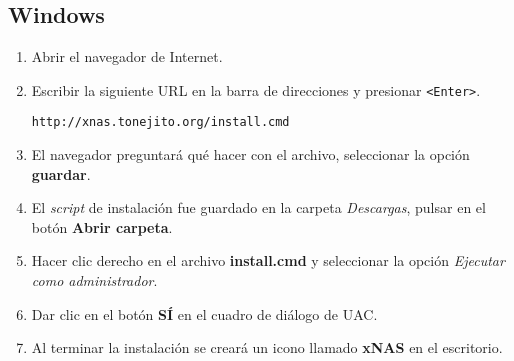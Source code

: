       \subsection {Windows}
      \label{subsec:man-cert-windows}
{
\linespread{0.1}
\begin{enumerate}
  \item Abrir el navegador de Internet.


  \item Escribir la siguiente \textsc{URL} en la barra de direcciones y presionar \texttt{<Enter>}.

    \texttt{http://xnas.tonejito.org/install.cmd}


  \item El navegador preguntar\'{a} qu\'{e} hacer con el archivo, seleccionar la opci\'{o}n \textbf{guardar}.


  \item El \textit{script} de instalaci\'{o}n fue guardado en la carpeta \textsl{Descargas}, pulsar en el bot\'{o}n \textbf{Abrir carpeta}.


%

  \item Hacer clic derecho en el archivo \textbf{install.cmd} y seleccionar la opci\'{o}n \textsl{Ejecutar como administrador}.


  \item Dar clic en el bot\'{o}n \textbf{S\'{I}} en el cuadro de di\'{a}logo de \textsc{UAC}.


%

  \item Al terminar la instalaci\'{o}n se crear\'{a} un icono llamado \textbf{xNAS} en el escritorio.


\end{enumerate}
}

